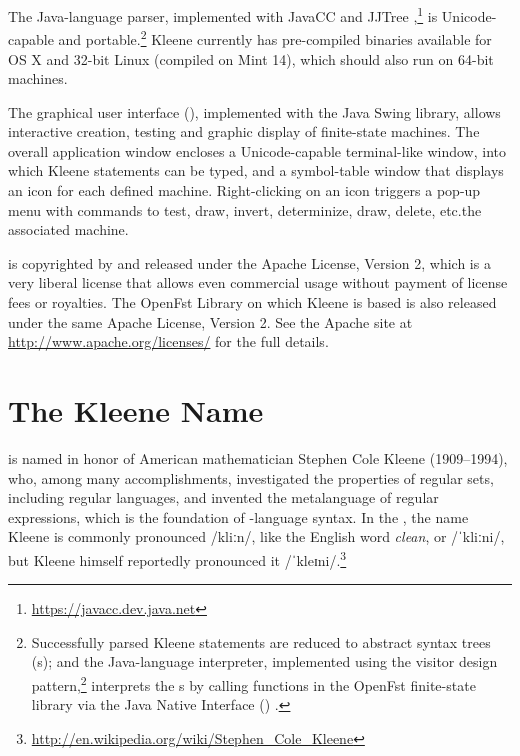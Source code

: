 The Java-language \Kleene{} parser, implemented with JavaCC and
JJTree \citep{copeland:2007},\footnote{\url{https://javacc.dev.java.net}} 
is Unicode-capable and portable.\footnote{Successfully parsed Kleene statements are reduced to abstract
syntax trees (s); and the Java-language interpreter,
implemented using the visitor design
pattern,\footnote{\url{http://en.wikipedia.org/wiki/Visitor_pattern}} 
interprets the s by calling \CPP{} functions in the
OpenFst finite-state 
library
\citep{allauzen+riley+schalkwyk+skut+mohri:2007}
via the Java Native Interface
() \citep{gordon:1998,liang:1999}. } Kleene currently has
pre-compiled binaries available for
OS X and 32-bit Linux (compiled on Mint 14), which should also run on 64-bit
machines.

The \Kleene{} graphical user interface (), implemented with 
the Java Swing library, 
allows interactive creation, testing and graphic display
of finite-state machines.  The overall application window encloses a Unicode-capable terminal-like window, into which Kleene statements
can be typed,
and a symbol-table window that displays an icon for each defined
machine.  Right-clicking on an icon triggers a pop-up menu with
commands to test, draw, invert, determinize, draw, delete, 
etc.\@ the associated machine.

\Kleene{} is copyrighted by   and released under the Apache License, Version 2, which
is a very liberal license that allows even commercial usage without payment of license fees or
royalties.  The OpenFst Library on which Kleene is based is also released under the same Apache License,
Version 2.  See the Apache site at \url{http://www.apache.org/licenses/} for the full details.

\section{The Kleene Name}

\Kleene{} is named in honor of American mathematician Stephen Cole Kleene
(1909--1994), who, among many accomplishments, investigated the properties of regular sets, including
regular languages, and invented the metalanguage of regular expressions, which is the foundation of
\Kleene{}-language syntax.  In the , the name Kleene is
commonly pronounced /kliːn/, like the English word \emph{clean}, 
or /ˈkliːni/, but Kleene himself reportedly pronounced it
/ˈkleɪni/.\footnote{\url{http://en.wikipedia.org/wiki/Stephen_Cole_Kleene}}

